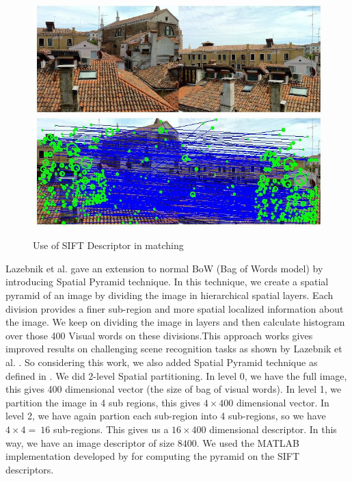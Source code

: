  \begin{center}
\begin{figure}
\centering
\includegraphics[width=\linewidth]{./Pictures/SIFT/siftMatching.jpg}
\includegraphics[width=\linewidth]{./Pictures/SIFT/siftMatchingDescriptor.jpg}
\caption{Use of SIFT Descriptor in matching }
\label{fig:siftMatching}
\end{figure}
\end{center}
    Lazebnik et al. \cite{bagOfWords} gave an extension to normal BoW (Bag of Words model) by introducing Spatial Pyramid technique. In this technique, we create a spatial pyramid of an image by dividing the image in hierarchical spatial layers. Each division provides a finer sub-region and more spatial localized information about the image. We keep on dividing the image in layers and then calculate histogram over those 400 Visual words on these divisions.This approach works gives improved results on challenging scene recognition tasks as shown by Lazebnik et al. \cite{bagOfWords}. So considering this work, we also added Spatial Pyramid technique as defined in \cite{bagOfWords} .
    We did 2-level Spatial partitioning. In level 0, we have the full image, this gives 400 dimensional vector (the size of bag of visual words). In level 1, we partition the image in 4 sub regions, this gives $4 \times 400$ dimensional vector. In level 2, we have again partion each sub-region into 4 sub-regions, so we have $4 \times 4 =\  16 $ sub-regions. This gives us a $16 \times 400 $ dimensional descriptor. In this way, we have an image descriptor of size $8400$. We used the MATLAB implementation developed by \cite{bagOfWords} for computing the pyramid on the SIFT descriptors.
